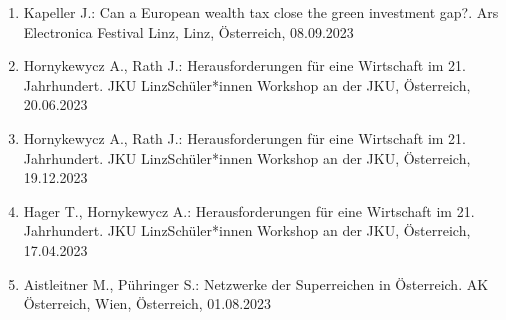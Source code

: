 \begin{enumerate}
	\item Kapeller J.: Can a European wealth tax close the green investment gap?. Ars Electronica Festival Linz, Linz, Österreich, 08.09.2023
	\item Hornykewycz A., Rath J.: Herausforderungen für eine Wirtschaft im 21. Jahrhundert. JKU LinzSchüler*innen Workshop an der JKU, Österreich, 20.06.2023
	\item Hornykewycz A., Rath J.: Herausforderungen für eine Wirtschaft im 21. Jahrhundert. JKU LinzSchüler*innen Workshop an der JKU, Österreich, 19.12.2023
	\item Hager T., Hornykewycz A.: Herausforderungen für eine Wirtschaft im 21. Jahrhundert. JKU LinzSchüler*innen Workshop an der JKU, Österreich, 17.04.2023
	\item Aistleitner M., Pühringer S.: Netzwerke der Superreichen in Österreich. AK Österreich, Wien, Österreich, 01.08.2023
\end{enumerate}
